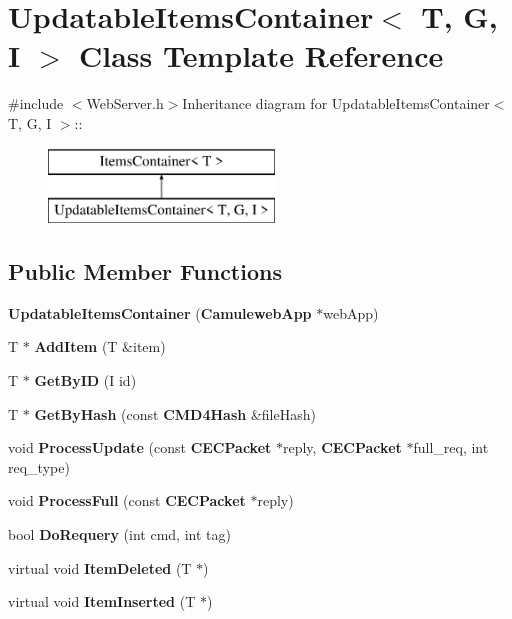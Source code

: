 \section{UpdatableItemsContainer$<$ T, G, I $>$ Class Template Reference}
\label{classUpdatableItemsContainer}


{\ttfamily \#include $<$WebServer.h$>$}Inheritance diagram for UpdatableItemsContainer$<$ T, G, I $>$::\begin{figure}[H]
\begin{center}
\leavevmode
\includegraphics[height=2cm]{classUpdatableItemsContainer}
\end{center}
\end{figure}
\subsection*{Public Member Functions}
\begin{DoxyCompactItemize}
\item 
{\bfseries UpdatableItemsContainer} ({\bf CamulewebApp} $\ast$webApp)\label{classUpdatableItemsContainer_a69252b2d05434ddf47a7c6817edfbc6b}

\item 
T $\ast$ {\bfseries AddItem} (T \&item)\label{classUpdatableItemsContainer_aa91a0316d7ca2263d5266792ce916f5d}

\item 
T $\ast$ {\bfseries GetByID} (I id)\label{classUpdatableItemsContainer_ab3cb7f7461a6f898ab42251286e8634c}

\item 
T $\ast$ {\bfseries GetByHash} (const {\bf CMD4Hash} \&fileHash)\label{classUpdatableItemsContainer_aa180319e39de34c38222e927a31ec8bb}

\item 
void {\bf ProcessUpdate} (const {\bf CECPacket} $\ast$reply, {\bf CECPacket} $\ast$full\_\-req, int req\_\-type)
\item 
void {\bfseries ProcessFull} (const {\bf CECPacket} $\ast$reply)\label{classUpdatableItemsContainer_a9eaebcc34c70df18023ac44e8fac1945}

\item 
bool {\bfseries DoRequery} (int cmd, int tag)\label{classUpdatableItemsContainer_a13cc960748bdffe071ef05e569fc9670}

\item 
virtual void {\bfseries ItemDeleted} (T $\ast$)\label{classUpdatableItemsContainer_ae1b3ed2fa2605f9be634a097efb8ba43}

\item 
virtual void {\bfseries ItemInserted} (T $\ast$)\label{classUpdatableItemsContainer_ad106e2fcdf4961864c33e8aa28916cf3}

\end{DoxyCompactItemize}
